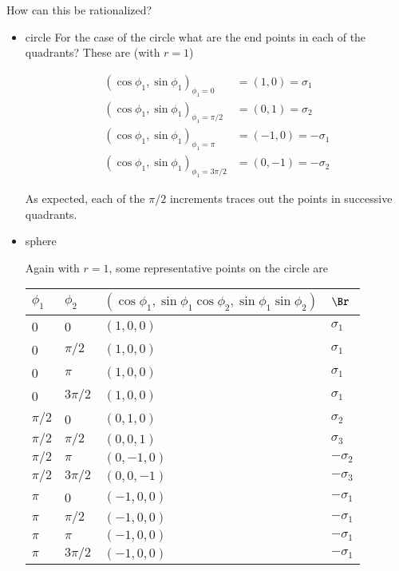 How can this be rationalized?

\begin{itemize}
\item circle
For the case of the circle what are the end points in each of the quadrants?  These are (with $r=1$)

\begin{align*}
(\cos\phi_1, \sin\phi_1)_{\phi_1 = 0}        &= ( 1, 0 ) = \sigma_1 \\
(\cos\phi_1, \sin\phi_1)_{\phi_1 = \pi/2}    &= ( 0, 1 ) = \sigma_2 \\
(\cos\phi_1, \sin\phi_1)_{\phi_1 = \pi}      &= ( -1, 0 ) = -\sigma_1 \\
(\cos\phi_1, \sin\phi_1)_{\phi_1 = 3\pi/2}   &= ( 0, -1 ) = -\sigma_2
\end{align*}

As expected, each of the $\pi/2$ increments traces out the points in successive quadrants.

\item sphere

Again with $r=1$, some representative points on the circle are

\begin{tabular}{|l|l|l|l|}
\hline
$\phi_1$ & $\phi_2$ & $(\cos\phi_1, \sin\phi_1 \cos\phi_2, \sin\phi_1 \sin\phi_2)$ & $\Br$ \\
\hline
0 & 0 & $(1,0,0)$ & $\sigma_1$ \\
0 & $\pi/2$ &  $(1,0,0)$ & $\sigma_1$ \\
0 & $\pi$ &  $(1,0,0)$ & $\sigma_1$ \\
0 & $3\pi/2$ &  $(1,0,0)$ & $\sigma_1$ \\
%
%
%
$\pi/2$ & 0 &  $(0,1,0)$ & $\sigma_2$ \\
$\pi/2$ & $\pi/2$ &  $(0,0,1)$ & $\sigma_3$ \\
$\pi/2$ & $\pi$ &  $(0,-1,0)$ & $-\sigma_2$ \\
$\pi/2$ & $3\pi/2$ &  $(0,0,-1)$ & $-\sigma_3$ \\
%
%
%
$\pi$ & 0 &  $(-1,0,0)$ & $-\sigma_1$ \\
$\pi$ & $\pi/2$ &  $(-1,0,0)$ & $-\sigma_1$ \\
$\pi$ & $\pi$ &  $(-1,0,0)$ & $-\sigma_1$ \\
$\pi$ & $3\pi/2$ & $(-1,0,0)$ & $-\sigma_1$ \\
\hline
\end{tabular}


\end{itemize}

